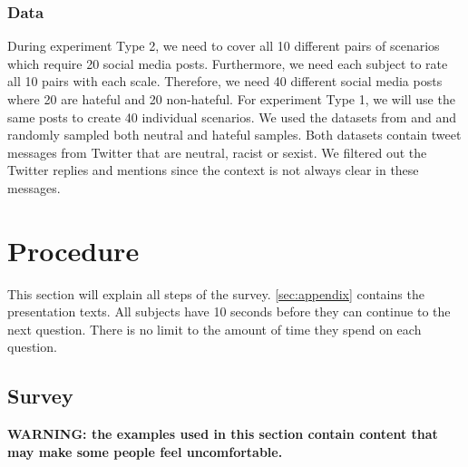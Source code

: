 \documentclass[a4paper]{article}
\begin{document}
\subsubsection{Data}
During experiment Type 2, we need to cover all 10 different pairs of scenarios which require 20 social media posts. Furthermore, we need each subject to rate all 10 pairs with each scale. Therefore, we need 40 different social media posts where 20 are hateful and 20 non-hateful. For experiment Type 1, we will use the same posts to create 40 individual scenarios. We used the datasets from \cite{waseem2016hateful} and \cite{basile2019semeval} and randomly sampled both neutral and hateful samples. Both datasets contain tweet messages from Twitter that are neutral, racist or sexist. We filtered out the Twitter replies and mentions since the context is not always clear in these messages.

\section{Procedure}
This section will explain all steps of the survey. \autoref{sec:appendix} contains the presentation texts. All subjects have 10 seconds before they can continue to the next question. There is no limit to the amount of time they spend on each question.

\subsection{Survey}
\textbf{WARNING: the examples used in this section contain content that may make some people feel uncomfortable.}
\end{document}
